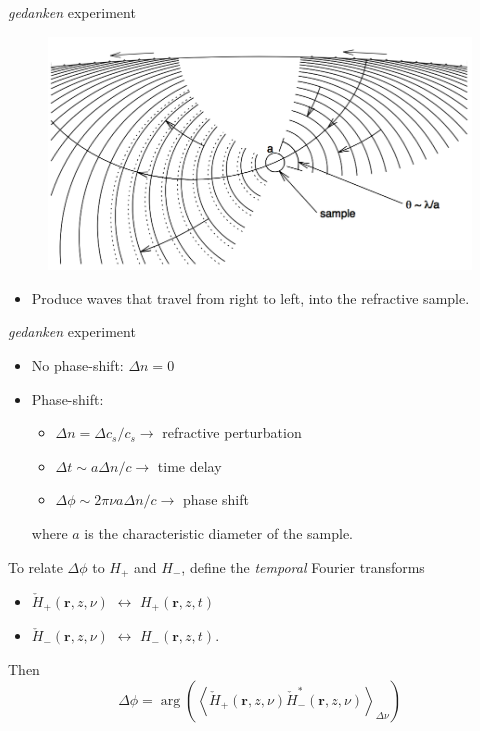 \documentclass{beamer}
\begin{document}
\begin{frame}{\emph{gedanken} experiment}
    \vspace{-0.25cm}
    \begin{figure}
        \includegraphics[width=\textwidth]{fig_6.png}
    \end{figure}
    \vspace{-0.25cm}
    \begin{itemize}
        \item Produce waves that travel from right to left, into the
            refractive sample.
    \end{itemize}
\end{frame}
\begin{frame}{\emph{gedanken} experiment}
    \begin{itemize}
        \item No phase-shift: $\Delta{n} = 0$
        \item Phase-shift:
            \begin{itemize}
                \item $\Delta{n} = \Delta{c_{s}}/c_{s} \rightarrow$
                    refractive perturbation
                \item $\Delta{t} \sim a\Delta{n}/c \rightarrow$
                    time delay
                \item $\Delta{\phi} \sim 2\pi\nu a\Delta{n}/c \rightarrow$
                    phase shift
            \end{itemize}
        where $a$ is the characteristic diameter of the sample.
    \end{itemize}

    To relate $\Delta\phi$ to $H_{+}$ and $H_{-}$, define the
    \emph{temporal} Fourier transforms
    \begin{itemize}
        \item $ \check{H}_{+}(\mathbf{r},z,\nu)  $
            $ \leftrightarrow$
            $ {H}_{+}(\mathbf{r},z,t)  $
        \item $ \check{H}_{-}(\mathbf{r},z,\nu)  $
            $ \leftrightarrow$
            $ {H}_{-}(\mathbf{r},z,t)$.
    \end{itemize}
    Then
    $$ \Delta\phi = \arg\left(\left\langle
        \check{H}_{+}(\mathbf{r},z,\nu)
        \check{H}_{-}^{*}(\mathbf{r},z,\nu)
        \right\rangle
        _{\Delta\nu}
        \right) $$
\end{frame}
\end{document}
